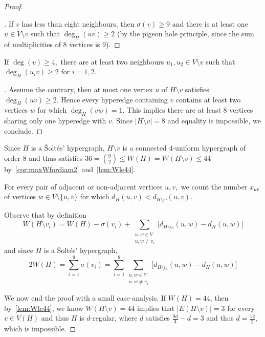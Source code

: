 \documentclass[10pt,a4paper]{amsart}
\newcommand*{\abs}[1]{\lvert #1\rvert}
\newenvironment{claimproof}[1][\myproofname]{\begin{proof}[#1]\renewcommand*{\qedsymbol}{\(\diamondsuit\)}}{\end{proof}}
\begin{document}
\begin{proof}
\begin{claimproof}
        If $v$ has less than eight neighbours, then $\sigma(v)\ge 9$ and there is at least one $u \in V \setminus v$ such that $\deg_H(uv)\ge 2$ (by the pigeon hole principle, since the sum of multiplicities of $8$ vertices is $9$).     
    \end{claimproof}


    \begin{claim}\label{clm:claimdeg4}
        If $\deg(v)\ge 4,$ there are at least two neighbours $u_1,u_2 \in V \setminus v$ such that $\deg_H(u_iv)\ge 2$ for $i=1,2$.
    \end{claim}
    \begin{claimproof}
        Assume the contrary, then at most one vertex $u$ of $H \setminus v$ satisfies $\deg_H(uv)\ge 2$. Hence every hyperedge containing $v$ contains at least two vertices $w$ for which $\deg_H(vw)=1.$
        This implies there are at least $8$ vertices sharing only one hyperedge with $v$. Since $\abs{H \setminus v}=8$ and equality is impossible, we conclude.
    \end{claimproof}



Since $H$ is a \v Solt\'es' hypergraph, $H\setminus v$ is a connected $4$-uniform hypergraph of order $8$ and thus satisfies $36=\binom 92 \le W(H)=W(H\setminus v)\le44$ by~\cref{cor:maxWfordiam2} and~\cref{lem:Wle44}.

For every pair of adjacent or non-adjacent vertices $u,v,$ we count the number $x_{uv}$ of vertices $w \in V \setminus\{u,v\}$ for which $d_H(u,v)<d_{H \setminus w}(u,v).$

Observe that by definition
\begin{equation} \label{eq:wiener-index}
    W(H \setminus v_i) = W(H) - \sigma(v_i) + \sum_{\substack{u, w \in V \\ u, w \neq v_i}} \big[d_{H \setminus v_i}(u, w) - d_H(u, w)\big]
\end{equation}
and since $H$ is a \v Solt\'es' hypergraph,
\begin{equation} \label{eq:wiener-index2}
        2W(H)=\sum_{i=1}^{9}\sigma(v_i) = \sum_{i=1}^{9}\sum_{\substack{u, w \in V \\ u, w \neq v_i}} \big[d_{H \setminus v_i}(u, w) - d_H(u, w)\big]
\end{equation}

We now end the proof with a small case-analysis.
If $W(H)=44$, then by~\cref{lem:Wle44}, we know $W(H\setminus v)=44$ implies that $\abs{E(H\setminus v)}=3$ for every $v \in V(H)$ and thus $H$ is $d$-regular, where $d$ satisfies $\frac{9d}{4}-d=3$ and thus $d=\frac{12}{5},$ which is impossible.


\end{proof}
\end{document}
